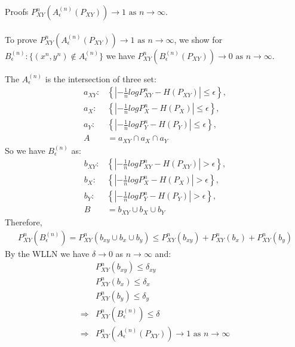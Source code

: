 \documentclass[
  course = {{EE623 Information Theory}},
  quartile = {{4}},
  assignment = 7,
  name = {{Mohammad Mahdi Rahimi}},
  studentnumber = {{20208244}},
  email = {{mahi@kaist.ac.kr}},
  firstexercise = 1
]{aga-homework}
\begin{document}
\exercise Proofs
\subexercise $P^n_{XY}(A^{(n)}_\epsilon(P_{XY})) \rightarrow 1\text{ as } n \rightarrow \infty$.
\\\\
To prove $P^n_{XY}(A^{(n)}_\epsilon(P_{XY})) \rightarrow 1\text{ as } n \rightarrow \infty$, we show for $B^{(n)}_\epsilon: \{(x^n, y^n) \notin A^{(n)}_\epsilon\}$ we have $P^n_{XY}(B^{(n)}_\epsilon(P_{XY})) \rightarrow 0\text{ as } n \rightarrow \infty$.

The $A^{(n)}_\epsilon$ is the intersection of three set: 
\begin{equation} \label{eq1}
\begin{split}
a_{XY}:& \left\{\left|-\frac{1}{n}logP^n_{XY} - H(P_{XY})\right| \le \epsilon \right\},\\
a_X:& \left\{\left|-\frac{1}{n}logP^n_{X} - H(P_{X})\right| \le \epsilon \right\},\\
a_Y:& \left\{\left|-\frac{1}{n}logP^n_{Y} - H(P_{Y})\right| \le \epsilon \right\},\\
A &= a_{XY} \cap a_X \cap a_Y
\end{split}
\end{equation}
So we have $B^{(n)}_\epsilon$ as:
\begin{equation} \label{eq2}
\begin{split}
b_{XY}:& \left\{\left|-\frac{1}{n}logP^n_{XY} - H(P_{XY})\right| > \epsilon \right\},\\
b_X:& \left\{\left|-\frac{1}{n}logP^n_{X} - H(P_{X})\right| > \epsilon \right\},\\
b_Y:& \left\{\left|-\frac{1}{n}logP^n_{Y} - H(P_{Y})\right| > \epsilon \right\},\\
B &= b_{XY} \cup b_X \cup b_Y
\end{split}
\end{equation}
Therefore,
\begin{equation} \label{eq3}
\begin{split}
P^n_{XY}(B^{(n)}_\epsilon) = P^n_{XY}(b_{xy} \cup b_x \cup b_y) \le P^n_{XY}(b_{xy}) + P^n_{XY}(b_x) + P^n_{XY}(b_y)
\end{split}
\end{equation}
By the WLLN we have $\delta \rightarrow 0 $ as $n \rightarrow \infty$ and:
\begin{equation} \label{eq4}
\begin{split}
&P^n_{XY}(b_{xy}) \le \delta_{xy} \\
&P^n_{XY}(b_x) \le \delta_x\\
&P^n_{XY}(b_y) \le \delta_y\\
\Rightarrow &P^n_{XY}(B^{(n)}_\epsilon) \le \delta\\
\Rightarrow &P^n_{XY}(A^{(n)}_\epsilon(P_{XY})) \rightarrow 1 \text{ as } n \rightarrow \infty 
\end{split}
\end{equation}
\end{document}
